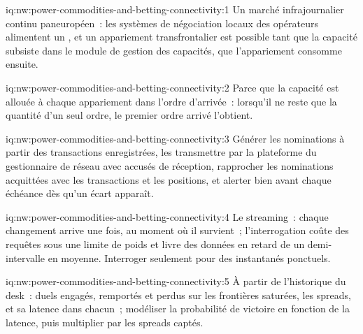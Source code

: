 \begin{solution}{iq:nw:power-commodities-and-betting-connectivity:1}
Un marché infrajournalier continu paneuropéen~: les systèmes de négociation locaux des opérateurs alimentent un , et un appariement transfrontalier est
possible tant que la capacité subsiste dans le module de gestion des capacités, que l'appariement consomme ensuite.
\end{solution}

\begin{solution}{iq:nw:power-commodities-and-betting-connectivity:2}
Parce que la capacité est allouée à chaque appariement dans l'ordre d'arrivée~: lorsqu'il ne reste que la quantité d'un seul ordre, le premier ordre arrivé l'obtient.
\end{solution}

\begin{solution}{iq:nw:power-commodities-and-betting-connectivity:3}
Générer les nominations à partir des transactions enregistrées, les transmettre par la plateforme du gestionnaire de réseau avec accusés de réception, rapprocher les nominations acquittées
avec les transactions et les positions, et alerter bien avant chaque échéance dès qu'un écart apparaît.
\end{solution}

\begin{solution}{iq:nw:power-commodities-and-betting-connectivity:4}
Le streaming~: chaque changement arrive une fois, au moment où il survient~; l'interrogation coûte des requêtes sous une limite de poids et livre des données en retard de
  un demi-intervalle en moyenne. Interroger seulement pour des instantanés ponctuels.
\end{solution}

\begin{solution}{iq:nw:power-commodities-and-betting-connectivity:5}
À partir de l'historique du desk~: duels engagés, remportés et perdus sur les frontières saturées, les spreads, et sa latence dans chacun~; modéliser la probabilité
de victoire en fonction de la latence, puis multiplier par les spreads captés.
\end{solution}

